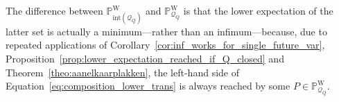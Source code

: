 \documentclass[10pt,a4paper]{paper}
\theoremstyle{definition}
\newtheorem{proposition}[theorem]{Proposition}
\newcommand{\reals}{\mathbb{R}}
\newcommand{\realsnonneg}{\reals_{\geq 0}}
\newcommand{\states}{\mathcal{X}}
\newcommand{\processes}{\mathbb{P}}
\newcommand{\wprocesses}{\processes^{\mathrm{W}}}
\newcommand{\wmprocesses}{\processes^{\mathrm{WM}}}
\newcommand{\gambles}{\mathcal{L}}
\newcommand{\rateset}{\mathcal{Q}}
\newcommand{\lrate}{\underline{Q}}
\begin{document}
The difference between $\wprocesses_{\text{int}(\rateset_{\lrate})}$ and $\wprocesses_{\rateset_{\lrate}}$ is that the lower expectation of the latter set is actually a minimum---rather than an infimum---because, due to repeated applications of Corollary~\ref{cor:inf_works_for_single_future_var}, Proposition~\ref{prop:lower_expectation_reached_if_Q_closed} and Theorem~\ref{theo:aanelkaarplakken}, the left-hand side of Equation~\eqref{eq:composition_lower_trans} is always reached by some $P\in\wprocesses_{\rateset_{\lrate}}$.

%
%
%
\end{document}
